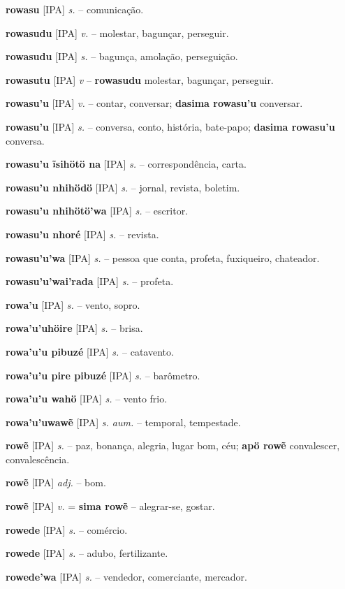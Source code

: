 \textbf{rowasu} [IPA] \textit{s.} -- comunicação.

\textbf{rowasudu} [IPA] \textit{v.} -- molestar, bagunçar, perseguir.

\textbf{rowasudu} [IPA] \textit{s.} -- bagunça, amolação, perseguição.

\textbf{rowasutu} [IPA] \textit{v} -- \textbf{rowasudu} molestar, bagunçar, perseguir.

\textbf{rowasu'u} [IPA] \textit{v.} -- contar, conversar; \textbf{dasima rowasu'u} conversar.

\textbf{rowasu'u} [IPA] \textit{s.} -- conversa, conto, história, bate-papo; \textbf{dasima rowasu'u} conversa.

\textbf{rowasu'u ĩsihötö na} [IPA] \textit{s.} -- correspondência, carta.

\textbf{rowasu'u nhihödö} [IPA] \textit{s.} -- jornal, revista, boletim.

\textbf{rowasu'u nhihötö'wa} [IPA] \textit{s.} -- escritor.

\textbf{rowasu'u nhoré} [IPA] \textit{s.} -- revista.

\textbf{rowasu'u'wa} [IPA] \textit{s.} -- pessoa que conta, profeta, fuxiqueiro, chateador.

\textbf{rowasu'u'wai'rada} [IPA] \textit{s.} -- profeta.

\textbf{rowa'u} [IPA] \textit{s.} -- vento, sopro.

\textbf{rowa'u'uhöire} [IPA] \textit{s.} -- brisa.

\textbf{rowa'u'u pibuzé} [IPA] \textit{s.} -- catavento.

\textbf{rowa'u'u pire pibuzé} [IPA] \textit{s.} -- barômetro.

\textbf{rowa'u'u wahö} [IPA] \textit{s.} -- vento frio.

\textbf{rowa'u'uwawẽ} [IPA] \textit{s. aum.} -- temporal, tempestade.

\textbf{rowẽ} [IPA] \textit{s.} -- paz, bonança, alegria, lugar bom, céu; \textbf{apö rowẽ} convalescer, convalescência.

\textbf{rowẽ} [IPA] \textit{adj.} -- bom.

\textbf{rowẽ} [IPA] \textit{v.} = \textbf{sima rowẽ} -- alegrar-se, gostar.

\textbf{rowede} [IPA] \textit{s.} -- comércio.

\textbf{rowede} [IPA] \textit{s.} -- adubo, fertilizante.

\textbf{rowede'wa} [IPA] \textit{s.} -- vendedor, comerciante, mercador.

